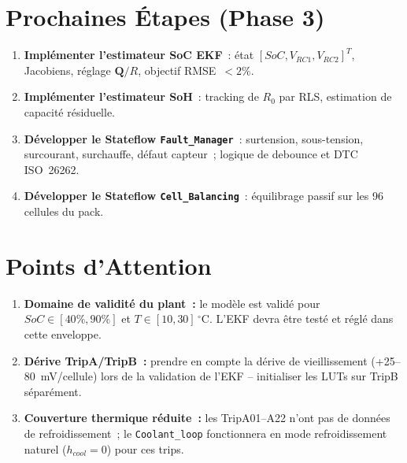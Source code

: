 \documentclass[a4paper,11pt]{article}
\begin{document}
\section{Prochaines Étapes (Phase 3)}

\begin{enumerate}[nosep]
  \item \textbf{Implémenter l'estimateur SoC EKF}~:
    état $[SoC, V_{RC1}, V_{RC2}]^T$, Jacobiens, réglage $\mathbf{Q}/R$,
    objectif RMSE~$<2\%$.
  \item \textbf{Implémenter l'estimateur SoH}~:
    tracking de $R_0$ par RLS, estimation de capacité résiduelle.
  \item \textbf{Développer le Stateflow \texttt{Fault\_Manager}}~:
    surtension, sous-tension, surcourant, surchauffe, défaut capteur~;
    logique de debounce et DTC ISO~26262.
  \item \textbf{Développer le Stateflow \texttt{Cell\_Balancing}}~:
    équilibrage passif sur les 96 cellules du pack.
\end{enumerate}

\section{Points d'Attention}

\begin{warnbox}
\begin{enumerate}[nosep]
  \item \textbf{Domaine de validité du plant~:} le modèle est validé pour
    $SoC \in [40\%, 90\%]$ et $T \in [10, 30]\,^\circ$C. L'EKF devra être
    testé et réglé dans cette enveloppe.
  \item \textbf{Dérive TripA/TripB~:} prendre en compte la dérive de
    vieillissement (+25--80~mV/cellule) lors de la validation de l'EKF --
    initialiser les LUTs sur TripB séparément.
  \item \textbf{Couverture thermique réduite~:} les TripA01--A22 n'ont pas de
    données de refroidissement~; le \texttt{Coolant\_loop} fonctionnera en
    mode refroidissement naturel ($h_{cool} = 0$) pour ces trips.
\end{enumerate}
\end{warnbox}
\end{document}
